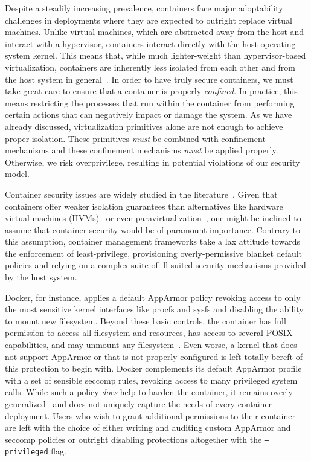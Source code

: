 Despite a steadily increasing prevalence, containers face major adoptability challenges in
deployments where they are expected to outright replace virtual machines. Unlike virtual
machines, which are abstracted away from the host and interact with a hypervisor,
containers interact directly with the host operating system kernel. This means that, while
much lighter-weight than hypervisor-based virtualization, containers are inherently less
isolated from each other and from the host system in
general~\cite{sultan2019_container_security, lin2018_container_security,
mullinix2020_security_measures, bui2015_docker_analysis}.  In order to have truly secure
containers, we must take great care to ensure that a container is properly
\textit{confined}. In practice, this means restricting the processes that run within the
container from performing certain actions that can negatively impact or damage the system.
As we have already discussed, virtualization primitives alone are not enough to achieve
proper isolation. These primitives \textit{must} be combined with confinement mechanisms
and these confinement mechanisms \textit{must} be applied properly. Otherwise, we risk
overprivilege, resulting in potential violations of our security model.

Container security issues are widely studied in the
literature~\cite{sultan2019_container_security, lin2018_container_security,
mp2016_hardening, mullinix2020_security_measures, bui2015_docker_analysis}.  Given that
containers offer weaker isolation guarantees than alternatives like hardware virtual
machines (HVMs)~ or even paravirtualization~, one might be inclined
to assume that container security would be of paramount importance. Contrary to this
assumption, container management frameworks take a lax attitude towards the enforcement of
least-privilege, provisioning overly-permissive blanket default policies and relying on
a complex suite of ill-suited security mechanisms provided by the host system.

Docker, for instance, applies a default AppArmor policy revoking access to only the most
sensitive kernel interfaces like procfs and sysfs and disabling the ability to mount new
filesystem.  Beyond these basic controls, the container has full permission to access all
filesystem and resources, has access to several POSIX capabilities, and may unmount any
filesystem~\cite{docker_apparmor, docker_default_apparmor}. Even worse, a kernel that does
not support AppArmor or that is not properly configured is left totally bereft of this
protection to begin with.  Docker complements its default AppArmor profile with a set of
sensible seccomp rules, revoking access to many privileged system calls. While such
a policy \textit{does} help to harden the container, it remains
overly-generalized~\cite{sultan2019_container_security} and does not uniquely capture the
needs of every container deployment. Users who wish to grant additional permissions to
their container are left with the choice of either writing and auditing custom AppArmor
and seccomp policies or outright disabling protections altogether with the
\texttt{--privileged} flag.

